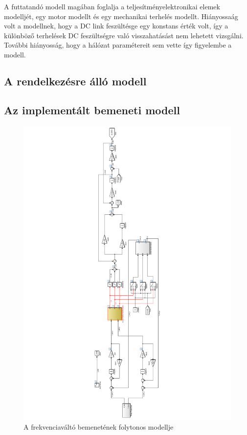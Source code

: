 A futtatandó modell magában foglalja a teljesítményelektronikai elemek modelljét, egy motor modellt és egy mechanikai terhelés modellt. Hiányossaág volt a modellnek, hogy a DC link feszültésge egy konstans érték volt, így a különböző terhelések DC feszültségre való visszahatásást nem lehetett vizsgálni. További hiányosság, hogy a hálózat paramétereit sem vette így figyelembe a modell.

\subsection{A rendelkezésre álló modell}



\subsection{Az implementált bemeneti modell}

\begin{figure}[]
	\centering
	\includegraphics[width = \textwidth]{figures/model_continous.pdf}
	\caption{A frekvenciaváltó bemenetének folytonos modellje} 
	\label{fig:cont_input_model}
\end{figure}


